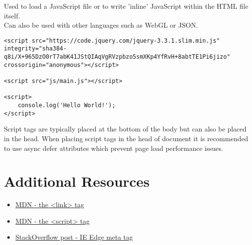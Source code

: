 Used to load a JavaScript file or to write 'inline' JavaScript within the HTML file itself.
\\

Can also be used with other languages such as WebGL or JSON.

\begin{verbatim}
<script src="https://code.jquery.com/jquery-3.3.1.slim.min.js" integrity="sha384-q8i/X+965DzO0rT7abK41JStQIAqVgRVzpbzo5smXKp4YfRvH+8abtTE1Pi6jizo" crossorigin="anonymous"></script>

<script src="js/main.js"></script>

<script>
    console.log('Hello World!');
</script>
\end{verbatim}

Script tags are typically placed at the bottom of the body but can also be placed in the head. When placing script tags in the head of document it is recommended to use async defer attributes which prevent page load performance issues.

\section{Additional Resources}

\begin{itemize}[leftmargin=*]
    \item \href{https://developer.mozilla.org/en-US/docs/Web/HTML/Element/link}{MDN - the <link> tag}
    \item \href{https://developer.mozilla.org/en-US/docs/Web/HTML/Element/script}{MDN - the <script> tag}
    \item \href{https://stackoverflow.com/questions/6771258/what-does-meta-http-equiv-x-ua-compatible-content-ie-edge-do}{StackOverflow post - IE Edge meta tag}
\end{itemize}